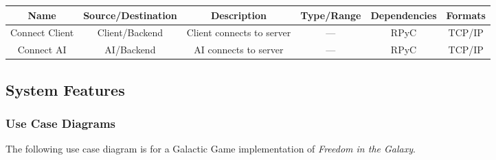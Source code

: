 \documentclass[twoside,letterpaper]{article}
\begin{document}
\bigskip

\begin{minipage}{\linewidth}
\centering
{}
\begin{tabular}{c c c c c c } \toprule[1.5pt]
\bf Name & \bf Source/Destination & \bf Description & \bf Type/Range & \bf Dependencies & \bf Formats\\ \toprule[1.0pt]
Connect Client & Client/Backend & Client connects to server & --- & RPyC & TCP/IP\\
Connect AI & AI/Backend & AI connects to server & --- & RPyC & TCP/IP\\
\bottomrule[1.5pt]
\end {tabular}\par
\end{minipage}

\clearpage %
\subsection{System Features}

\subsubsection{Use Case Diagrams}
The following use case diagram is for a Galactic Game implementation of \textit{Freedom in the Galaxy}.
\end{document}
